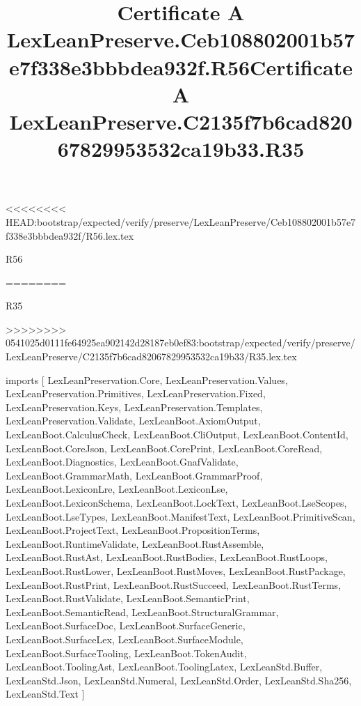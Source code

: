 <<<<<<<< HEAD:bootstrap/expected/verify/preserve/LexLeanPreserve/Ceb108802001b57e7f338e3bbbdea932f/R56.lex.tex
\begin{lexlean}{R56}
\title{Certificate A LexLeanPreserve.Ceb108802001b57e7f338e3bbbdea932f.R56}
========
\begin{lexlean}{R35}
\title{Certificate A LexLeanPreserve.C2135f7b6cad82067829953532ca19b33.R35}
>>>>>>>> 0541025d0111fe64925ea902142d28187eb0ef83:bootstrap/expected/verify/preserve/LexLeanPreserve/C2135f7b6cad82067829953532ca19b33/R35.lex.tex
\begin{coremodule}
imports [
  LexLeanPreservation.Core,
  LexLeanPreservation.Values,
  LexLeanPreservation.Primitives,
  LexLeanPreservation.Fixed,
  LexLeanPreservation.Keys,
  LexLeanPreservation.Templates,
  LexLeanPreservation.Validate,
  LexLeanBoot.AxiomOutput,
  LexLeanBoot.CalculusCheck,
  LexLeanBoot.CliOutput,
  LexLeanBoot.ContentId,
  LexLeanBoot.CoreJson,
  LexLeanBoot.CorePrint,
  LexLeanBoot.CoreRead,
  LexLeanBoot.Diagnostics,
  LexLeanBoot.GnafValidate,
  LexLeanBoot.GrammarMath,
  LexLeanBoot.GrammarProof,
  LexLeanBoot.LexiconLre,
  LexLeanBoot.LexiconLse,
  LexLeanBoot.LexiconSchema,
  LexLeanBoot.LockText,
  LexLeanBoot.LseScopes,
  LexLeanBoot.LseTypes,
  LexLeanBoot.ManifestText,
  LexLeanBoot.PrimitiveScan,
  LexLeanBoot.ProjectText,
  LexLeanBoot.PropositionTerms,
  LexLeanBoot.RuntimeValidate,
  LexLeanBoot.RustAssemble,
  LexLeanBoot.RustAst,
  LexLeanBoot.RustBodies,
  LexLeanBoot.RustLoops,
  LexLeanBoot.RustLower,
  LexLeanBoot.RustMoves,
  LexLeanBoot.RustPackage,
  LexLeanBoot.RustPrint,
  LexLeanBoot.RustSucceed,
  LexLeanBoot.RustTerms,
  LexLeanBoot.RustValidate,
  LexLeanBoot.SemanticPrint,
  LexLeanBoot.SemanticRead,
  LexLeanBoot.StructuralGrammar,
  LexLeanBoot.SurfaceDoc,
  LexLeanBoot.SurfaceGeneric,
  LexLeanBoot.SurfaceLex,
  LexLeanBoot.SurfaceModule,
  LexLeanBoot.SurfaceTooling,
  LexLeanBoot.TokenAudit,
  LexLeanBoot.ToolingAst,
  LexLeanBoot.ToolingLatex,
  LexLeanStd.Buffer,
  LexLeanStd.Json,
  LexLeanStd.Numeral,
  LexLeanStd.Order,
  LexLeanStd.Sha256,
  LexLeanStd.Text
]


\end{coremodule}
\end{lexlean}
\end{lexlean}
